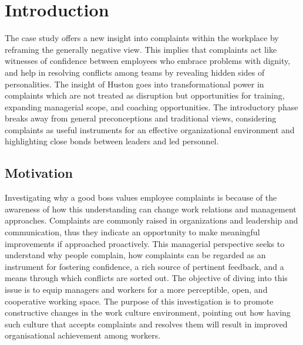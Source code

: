 \documentclass[a4paper,12pt]{report}
\begin{document}
\chapter{Introduction}
The case study offers a new insight into complaints within the workplace by reframing the generally negative view. This implies that complaints act like witnesses of confidence between employees who embrace problems with dignity, and help in resolving conflicts among teams by revealing hidden sides of personalities. The insight of Huston goes into transformational power in complaints which are not treated as disruption but opportunities for training, expanding managerial scope, and coaching opportunities. The introductory phase breaks away from general preconceptions and traditional views, considering complaints as useful instruments for an effective organizational environment and highlighting close bonds between leaders and led personnel.
\section{Motivation}
\begin{enumerate}
Investigating why a good boss values employee complaints is because of the awareness of how this understanding can change work relations and management approaches. Complaints are commonly raised in organizations and leadership and communication, thus they indicate an opportunity to make meaningful improvements if approached proactively. This managerial perspective seeks to understand why people complain, how complaints can be regarded as an instrument for fostering confidence, a rich source of pertinent feedback, and a means through which conflicts are sorted out. The objective of diving into this issue is to equip managers and workers for a more perceptible, open, and cooperative working space. The purpose of this investigation is to promote constructive changes in the work culture environment, pointing out how having such culture that accepts complaints and resolves them will result in improved organisational achievement among workers.    
\end{enumerate}
\end{document}
